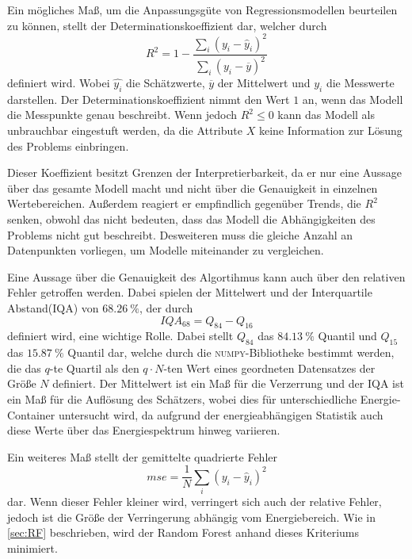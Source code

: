 Ein mögliches Maß, um die Anpassungsgüte von Regressionsmodellen beurteilen zu können, stellt der Determinationskoeffizient dar, welcher
durch
\begin{equation}
  R^2 = 1 - \frac{\sum_i (y_i-\hat{y}_i)^2}{\sum_i (y_i - \overline{y})^2}
\end{equation}
definiert wird. Wobei $\hat{y_i}$ die Schätzwerte, $\overline{y}$ der Mittelwert und $y_i$ die Messwerte darstellen.
Der Determinationskoeffizient nimmt den Wert $1$ an, wenn das Modell die Messpunkte genau beschreibt. Wenn jedoch
$R^2 \leq 0$ kann das Modell als unbrauchbar eingestuft werden, da die Attribute $X$ keine Information zur
Lösung des Problems einbringen.

Dieser Koeffizient besitzt Grenzen der Interpretierbarkeit, da er nur eine Aussage über das gesamte Modell macht und
nicht über die Genauigkeit in einzelnen Wertebereichen.
Außerdem reagiert er empfindlich gegenüber Trends, die $R^2$ senken, obwohl das nicht bedeuten, dass das Modell die Abhängigkeiten des Problems
nicht gut beschreibt.
Desweiteren muss die gleiche Anzahl an Datenpunkten vorliegen, um Modelle
miteinander zu vergleichen.

Eine Aussage über die Genauigkeit des Algortihmus kann auch über den relativen Fehler getroffen werden. Dabei spielen der Mittelwert und der
Interquartile Abstand(IQA) von $\SI{68.26}{\percent}$, der durch
\begin{equation}
  IQA_{68} = Q_{84}-Q_{16}
\end{equation}
definiert wird, eine wichtige Rolle.
Dabei stellt $Q_{84}$ das $\SI{84.13}{\percent}$ Quantil und $Q_{15}$ das $\SI{15.87}{\percent}$ Quantil dar, welche durch die \textsc{numpy}-Bibliotheke\cite{scipy}
bestimmt werden, die das $q$-te Quartil als den $q \cdot N$-ten Wert eines geordneten Datensatzes der Größe $N$ definiert.
Der Mittelwert ist ein Maß für die Verzerrung und der IQA ist ein Maß für die Auflösung des Schätzers, wobei dies für unterschiedliche
Energie-Container untersucht wird, da aufgrund der energieabhängigen Statistik auch diese Werte über das Energiespektrum hinweg variieren.

Ein weiteres Maß stellt der gemittelte quadrierte Fehler
\begin{equation}
  mse = \frac{1}{N} \sum_i (y_i-\hat{y}_i)^2
\end{equation}
dar.
Wenn dieser Fehler kleiner wird, verringert sich auch der relative Fehler, jedoch ist die Größe der Verringerung abhängig vom Energiebereich.
Wie in \autoref{sec:RF} beschrieben, wird der Random Forest anhand dieses Kriteriums minimiert.

